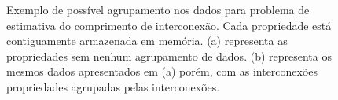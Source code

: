 \begin{figure}[ht]
    \centering
    
    \caption[Exemplo de agrupamento dos dados]{Exemplo de possível agrupamento nos dados para problema de estimativa do comprimento de interconexão. Cada propriedade está contiguamente armazenada em memória. (a) representa as propriedades sem nenhum agrupamento de dados. (b) representa os mesmos dados apresentados em (a) porém, com as interconexões propriedades agrupadas pelas interconexões.}
    \label{fig:sorting_data_example}
\end{figure}